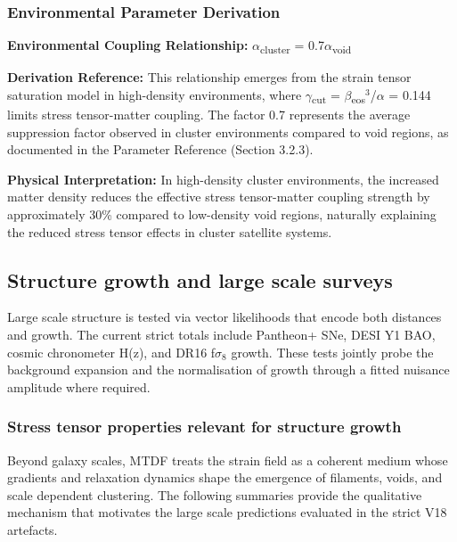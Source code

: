 \documentclass[11pt,a4paper]{article}
\begin{document}
\begin{mdframed}[linecolor=accent,linewidth=0.5pt,backgroundcolor=callout-bg,leftline=true,rightline=true,topline=true,bottomline=true,innerleftmargin=8pt,innerrightmargin=8pt,innertopmargin=6pt,innerbottommargin=6pt]
\subsubsection{Environmental Parameter Derivation}
\textbf{Environmental Coupling Relationship:} $\alpha$\textsubscript{cluster} = 0.7$\alpha$\textsubscript{void}

\textbf{Derivation Reference:} This relationship emerges from the strain tensor saturation model in high-density environments, where $\gamma$\textsubscript{cut} = $\beta$\textsubscript{eos}$^{3}$/$\alpha$ = 0.144 limits stress tensor-matter coupling. The factor 0.7 represents the average suppression factor observed in cluster environments compared to void regions, as documented in the  Parameter Reference (Section 3.2.3).

\textbf{Physical Interpretation:} In high-density cluster environments, the increased matter density reduces the effective stress tensor-matter coupling strength by approximately 30\% compared to low-density void regions, naturally explaining the reduced stress tensor effects in cluster satellite systems.
\end{mdframed}

\subsection{Structure growth and large scale surveys}
Large scale structure is tested via vector likelihoods that encode both distances and growth. The current strict totals include Pantheon+ SNe, DESI Y1 BAO, cosmic chronometer H(z), and DR16 f$\sigma$$_{8}$ growth. These tests jointly probe the background expansion and the normalisation of growth through a fitted nuisance amplitude where required.

\subsubsection{Stress tensor properties relevant for structure growth}
Beyond galaxy scales, MTDF treats the strain field as a coherent medium whose gradients and relaxation dynamics shape the emergence of filaments, voids, and scale dependent clustering. The following summaries provide the qualitative mechanism that motivates the large scale predictions evaluated in the strict V18 artefacts.
\end{document}

